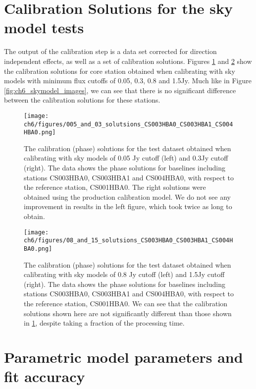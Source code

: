 \appendix

\renewcommand{\theequ}{\Alph{section}.\arabic{equ}}


\section{Calibration Solutions for the sky model tests }\label{ap:ch6_calib_solutions}
The output of the calibration step is a data set corrected for direction independent effects, as well as a set of calibration solutions. Figures \ref{fig:ch6_skymodel_rcalib_004_03} and \ref{fig:ch6_skymodel_rcalib_08_15} show the calibration solutions for core station obtained when calibrating with  sky models with minimum flux cutoffs of 0.05, 0.3, 0.8 and 1.5Jy. Much like in Figure \ref{fig:ch6_skymodel_images}, we can see that there is no significant difference between the calibration solutions for these stations. 

\begin{figure}
    \texttt{[image: ch6/figures/005\_and\_03\_solutsions\_CS003HBA0\_CS003HBA1\_CS004HBA0.png]}
      \caption{The calibration (phase) solutions for the test dataset obtained when calibrating with sky models of 0.05 Jy cutoff (left) and 0.3Jy cutoff (right). The data shows the phase solutions for baselines including stations CS003HBA0, CS003HBA1 and CS004HBA0, with respect to the reference station, CS001HBA0. The right solutions were obtained using the production calibration model. We do not see any improvement in results in the left figure, which took twice as long to obtain.}
	\label{fig:ch6_skymodel_rcalib_004_03}
\end{figure}


\begin{figure}
    \texttt{[image: ch6/figures/08\_and\_15\_solutsions\_CS003HBA0\_CS003HBA1\_CS004HBA0.png]}
      \caption{The calibration (phase) solutions for the test dataset obtained when calibrating with sky models of 0.8 Jy cutoff (left) and 1.5Jy cutoff (right). The data shows the phase solutions for baselines including stations CS003HBA0, CS003HBA1 and CS004HBA0, with respect to the reference station, CS001HBA0. We can see that the calibration solutions shown here are not significantly different than those shown in \ref{fig:ch6_skymodel_rcalib_004_03}, despite taking a fraction of the processing time.  }
	\label{fig:ch6_skymodel_rcalib_08_15}
\end{figure}

\section{Parametric model parameters and fit accuracy}\label{ap:ch6_model_params}

